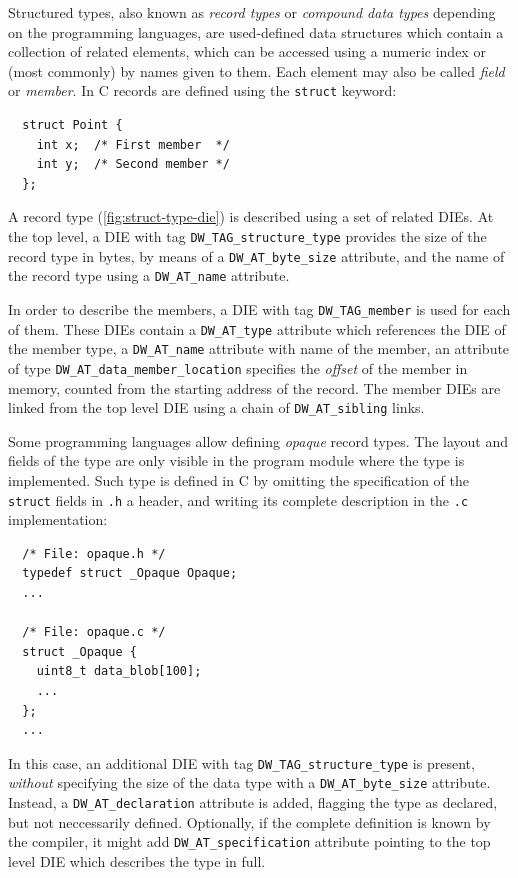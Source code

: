 \noindent Structured types, also known as \emph{record types} or
\emph{compound data types} depending on the programming languages, are
used-defined data structures which contain a collection of related elements,
which can be accessed using a numeric index or (most commonly) by names given
to them. Each element may also be called \emph{field} or \emph{member}. In
C records are defined using the \texttt{struct} keyword:

\begin{verbatim}
  struct Point {
    int x;  /* First member  */
    int y;  /* Second member */
  };
\end{verbatim}

\noindent A record type (\autoref{fig:struct-type-die}) is described using
a set of related DIEs. At the top level, a DIE with tag
\verb|DW_TAG_structure_type| provides the size of the record type in bytes, by
means of a \verb|DW_AT_byte_size| attribute, and the name of the record type
using a \verb|DW_AT_name| attribute.

In order to describe the members, a DIE with tag \verb|DW_TAG_member| is
used for each of them. These DIEs contain a \verb|DW_AT_type| attribute
which references the DIE of the member type, a \verb|DW_AT_name| attribute
with name of the member, an attribute of type
\verb|DW_AT_data_member_location| specifies the \emph{offset} of the member in
memory, counted from the starting address of the record. The member DIEs are
linked from the top level DIE using a chain of \verb|DW_AT_sibling| links.

Some programming languages allow defining \emph{opaque} record types. The
layout and fields of the type are only visible in the program module where the
type is implemented. Such type is defined in C by omitting the specification
of the \texttt{struct} fields in \verb|.h| a header, and writing its
complete description in the \verb|.c| implementation:

\begin{verbatim}
  /* File: opaque.h */
  typedef struct _Opaque Opaque;
  ...

  /* File: opaque.c */
  struct _Opaque {
    uint8_t data_blob[100];
    ...
  };
  ...
\end{verbatim}

In this case, an additional DIE with tag \verb|DW_TAG_structure_type| is
present, \emph{without} specifying the size of the data type with
a \verb|DW_AT_byte_size| attribute. Instead, a \verb|DW_AT_declaration|
attribute is added, flagging the type as declared, but not neccessarily
defined. Optionally, if the complete definition is known by the compiler, it
might add \verb|DW_AT_specification| attribute pointing to the top level DIE
which describes the type in full.


